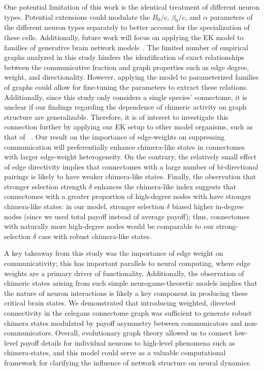 \documentclass[10pt,letterpaper]{article}
\begin{document}
One potential limitation of this work is the identical treatment of
different neuron types.
Potential extensions could modulate the $B_0/c$, $\beta_0/c$, and
$\alpha$ parameters of the different neuron types separately to better
account for the specialization of these cells.
Additionally, future work will focus on applying the EK model
to families of generative brain network models~\cite{betzel2016generativea}.
The limited number of empirical graphs analyzed in this study
hinders the identification of exact relationships
between the communicative fraction and graph properties
such as edge degree, weight, and directionality.
However, applying the model to parameterized families of graphs could allow
for fine-tuning the parameters to extract these relations.
Additionally, since this study only considers a single species' connectome,
it is unclear if our findings regarding the dependence
of chimeric activity on graph structure are generalizable.
Therefore, it is of interest to investigate this connection further
by applying our EK setup to other model organisms,
such as that of
~\cite{schlegel2024whole}.
Our result on the importance of edge-weights on suppressing
communication
will preferentially enhance chimera-like states in connectomes
with larger edge-weight heterogeneity.
On the contrary, the relatively small effect of edge directivity
implies that connectomes with a large number of bi-directional pairings
is likely to have weaker chimera-like states.
Finally, the observation that stronger selection strength $\delta$
enhances the chimera-like index suggests that connectomes with
a greater proportion of high-degree nodes with have stronger
chimera-like states:
in our model, stronger selection $\delta$ biased
higher in-degree nodes (since we used total payoff instead of average
payoff);
thus, connectomes with naturally more high-degree nodes
would be comparable to our strong-selection $\delta$ case
with robust chimera-like states.

A key takeaway from this study was the importance
of edge weight on communicativity;
this has important parallels to neural computing,
where edge weights are a primary driver of functionality.
Additionally, the observation of chimeric states
arising from such simple neurogame-theoretic models
implies that the nature of neuron interactions is likely
a key component in producing these critical brain states.
We demonstrated that introducing weighted, directed connectivity
in the \gls{celegans} connectome graph
was sufficient to generate robust chimera states
modulated by payoff asymmetry between communicators and non-communicators.
Overall, evolutionary graph theory allowed us
to connect low-level payoff details for individual neurons
to high-level phenomena such as chimera-states,
and this model could serve as a valuable computational framework
for clarifying the influence of network structure on neural dynamics.
\end{document}
